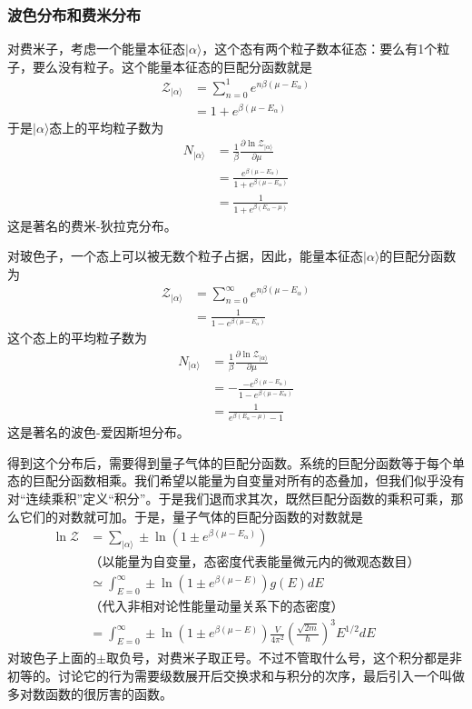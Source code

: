 \documentclass[a4paper,11pt]{ctexart}
\newcommand{\bea}{\begin{equation}\begin{aligned}}
\newcommand{\eea}{\end{aligned}\end{equation}}
\newcommand{\red}{\color{red}}
\newcommand{\grandz}{\mathcal{Z}}
\begin{document}
\subsubsection{波色分布和费米分布}
对费米子，考虑一个能量本征态$|\alpha \rangle$，这个态有两个粒子数本征态：要么有1个粒子，要么没有粒子。这个能量本征态的巨配分函数就是
\bea
\grandz_{|\alpha \rangle} &= \sum_{n=0}^1 e^{n\beta(\mu - E_\alpha)} \\
&= 1+ e^{\beta(\mu - E_\alpha)}
\eea
于是$|\alpha \rangle$态上的平均粒子数为
\bea
N_{|\alpha \rangle} &= \frac{1}{\beta} \frac{\partial \ln \grandz_{|\alpha \rangle}}{\partial \mu} \\
&=\frac{e^{\beta(\mu - E_\alpha)}}{1+e^{\beta(\mu - E_\alpha)}} \\
&= \frac{1}{1+e^{\beta(E_\alpha - \mu)}}
\eea
这是著名的{\red 费米-狄拉克分布}。
\par
对玻色子，一个态上可以被无数个粒子占据，因此，能量本征态$|\alpha \rangle$的巨配分函数为
\bea \label{bez}
\grandz_{|\alpha \rangle} &= \sum_{n=0}^\infty e^{n\beta(\mu - E_\alpha)} \\
&= \frac{1}{1- e^{\beta(\mu - E_\alpha)}}
\eea
这个态上的平均粒子数为
\bea
N_{|\alpha \rangle} &= \frac{1}{\beta} \frac{\partial \ln \grandz_{|\alpha \rangle}}{\partial \mu} \\
&=-\frac{-e^{\beta(\mu - E_\alpha)}}{1-e^{\beta(\mu - E_\alpha)}} \\
&= \frac{1}{ e^{\beta(E_\alpha - \mu)} - 1}
\eea
这是著名的{\red 波色-爱因斯坦分布}。
\par
得到这个分布后，需要得到量子气体的巨配分函数。系统的巨配分函数等于每个单态的巨配分函数相乘。我们希望以能量为自变量对所有的态叠加，但我们似乎没有对“连续乘积”定义“积分”。于是我们退而求其次，既然巨配分函数的乘积可乘，那么它们的对数就可加。于是，量子气体的巨配分函数的对数就是
\bea
\ln \grandz &= \sum_{|\alpha \rangle}\pm \ln (1 \pm e^{\beta(\mu - E_\alpha )}) \\
&\text{（以能量为自变量，态密度代表能量微元内的微观态数目）} \\
&\simeq \int_{E=0}^\infty \pm \ln (1 \pm e^{\beta(\mu - E)})g(E)dE \\
& \text{（代入非相对论性能量动量关系下的态密度）} \\
&=\int_{E=0}^\infty \pm \ln (1 \pm e^{\beta(\mu - E)})\frac{V}{4\pi^2} (\frac{\sqrt{2m}}{\hbar})^3 E^{1/2} dE
\eea
对玻色子上面的$\pm$取负号，对费米子取正号。不过不管取什么号，这个积分都是非初等的。讨论它的行为需要级数展开后交换求和与积分的次序，最后引入一个叫做多对数函数的很厉害的函数。
\end{document}
